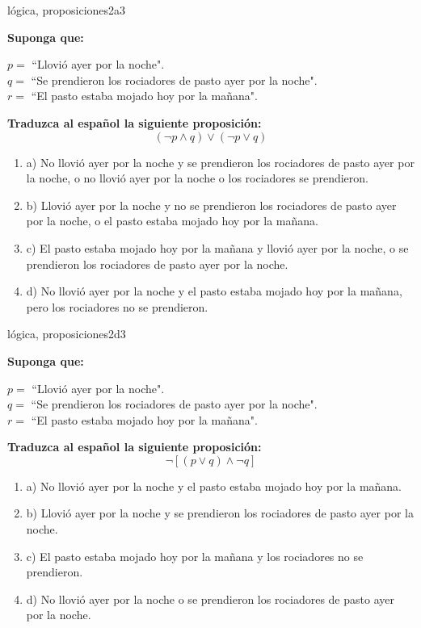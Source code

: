\documentclass{article}
\begin{document}
\begin{question}{7}{lógica, proposiciones}{2}{a}{3}{
\textbf{Suponga que:} \smallskip

\(p = \) ``Llovió ayer por la noche".\\
\(q = \) ``Se prendieron los rociadores de pasto ayer por la noche".\\
\(r = \) ``El pasto estaba mojado hoy por la mañana".\smallskip

\textbf{Traduzca al español la siguiente proposición:}
\[
(\neg p \land q) \lor (\neg p \lor q)
\]

\begin{enumerate}
   \item a) No llovió ayer por la noche y se prendieron los rociadores de pasto ayer por la noche, o no llovió ayer por la noche o los rociadores se prendieron.  
   \item b) Llovió ayer por la noche y no se prendieron los rociadores de pasto ayer por la noche, o el pasto estaba mojado hoy por la mañana.  
   \item c) El pasto estaba mojado hoy por la mañana y llovió ayer por la noche, o se prendieron los rociadores de pasto ayer por la noche.  
   \item d) No llovió ayer por la noche y el pasto estaba mojado hoy por la mañana, pero los rociadores no se prendieron.  
\end{enumerate}
}
\end{question}

\begin{question}{8}{lógica, proposiciones}{2}{d}{3}{
\textbf{Suponga que:} \smallskip

\(p = \) ``Llovió ayer por la noche".\\
\(q = \) ``Se prendieron los rociadores de pasto ayer por la noche".\\
\(r = \) ``El pasto estaba mojado hoy por la mañana".\smallskip

\textbf{Traduzca al español la siguiente proposición:}
\[
\neg [(p \lor q) \land \neg q]
\]

\begin{enumerate}
   \item a) No llovió ayer por la noche y el pasto estaba mojado hoy por la mañana. 
   \item b) Llovió ayer por la noche y se prendieron los rociadores de pasto ayer por la noche.  
   \item c) El pasto estaba mojado hoy por la mañana y los rociadores no se prendieron.  
   \item d) No llovió ayer por la noche o se prendieron los rociadores de pasto ayer por la noche. 
\end{enumerate}
}
\end{question}
\end{document}
